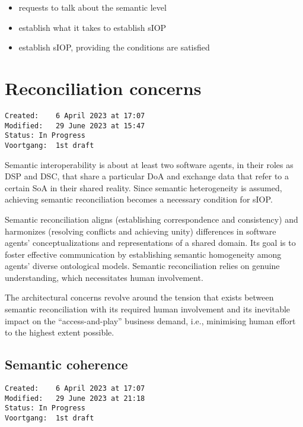 \documentclass[sort&compress,preprint,3p,authoryear,twocolumn]{elsarticle}
\providecommand{\tightlist}{%
  \setlength{\itemsep}{0pt}\setlength{\parskip}{0pt}}
\theoremstyle{break}			%
\begin{document}
\begin{itemize}
\tightlist
\item
  requests to talk about the semantic level
\item
  establish what it takes to establish sIOP
\item
  establish sIOP, providing the conditions are satisfied
\end{itemize}

\section{Reconciliation concerns}\label{reconciliation-concerns}

\begin{verbatim}
Created:    6 April 2023 at 17:07
Modified:   29 June 2023 at 15:47
Status: In Progress
Voortgang:  1st draft
\end{verbatim}

Semantic interoperability is about at least two software agents, in
their roles as DSP and DSC, that share a particular DoA and exchange
data that refer to a certain SoA in their shared reality. Since semantic
heterogeneity is assumed, achieving semantic reconciliation becomes a
necessary condition for sIOP.

\begin{mmdef}\label{def:semantic-reconciliation}
Semantic reconciliation aligns (establishing correspondence and consistency) and harmonizes (resolving conflicts and achieving unity) differences in software agents' conceptualizations and representations of a shared domain. Its goal is to foster effective communication by establishing semantic homogeneity among agents' diverse ontological models. Semantic reconciliation relies on genuine understanding, which necessitates human involvement.
\end{mmdef}

The architectural concerns revolve around the tension that exists
between semantic reconciliation with its required human involvement and
its inevitable impact on the ``access-and-play'' business demand, i.e.,
minimising human effort to the highest extent possible.

\subsection{Semantic coherence}\label{semantic-coherence}

\begin{verbatim}
Created:    6 April 2023 at 17:07
Modified:   29 June 2023 at 21:18
Status: In Progress
Voortgang:  1st draft
\end{verbatim}
\end{document}
